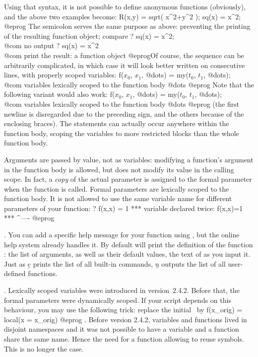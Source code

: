 \noindent Using that syntax, it is not possible to define anonymous functions
(obviously), and the above two examples become:
\bprog
R(x,y) = sqrt( x^2+y^2 );
sq(x) = x^2;
@eprog\noindent
The semicolon serves the same purpose as above: preventing the printing
of the resulting function object; compare
\bprog
? sq(x) = x^2;  \\@com no output
? sq(x) = x^2   \\@com print the result: a function object
@eprog\noindent Of course, the sequence  can be arbitrarily
complicated, in which case it will look better written on consecutive lines,
with properly scoped variables:
\bprogpart
{
f($x_0$, $x_1$, @dots) =
  my($t_0$, $t_1$, @dots); \\@com variables lexically scoped to the function body
  @dots
}
@eprog \noindent Note that the following variant would also work:
\bprogpart
f($x_0$, $x_1$, @dots) =
{
  my($t_0$, $t_1$, @dots); \\@com variables lexically scoped to the function body
  @dots
}
@eprog \noindent
(the first newline is disregarded due to the preceding \kbd{=} sign, and the
others because of the enclosing braces). The  statements can actually
occur anywhere within the function body, scoping the variables to more
restricted blocks than the whole function body.

Arguments are passed by value, not as variables: modifying a function's
argument in the function body is allowed, but does not modify its value in the
calling scope. In fact, a \emph{copy} of the actual parameter is assigned to
the formal parameter when the function is called. Formal parameters are
lexically scoped to the function body. It is not allowed to use the same
variable name for different parameters of your function:
\bprog
? f(x,x) = 1
  ***   variable declared twice: f(x,x)=1
  ***                                ^----
@eprog

.
You can add a specific help message for your function using ,
but the online help system already handles it. By default 
will print the definition of the function : the list of arguments,
as well as their default values, the text of  as you input it.
Just as \b{c} prints the list of all built-in commands, \b{u} outputs the
list of all user-defined functions.

. Lexically scoped
variables were introduced in version~2.4.2. Before that, the formal
parameters were dynamically scoped. If your script depends on this behaviour,
you may use the following trick: replace the initial  \ by
\bprog
f(x_orig) = local(x = x_orig)
@eprog
. Before version
2.4.2, variables and functions lived in disjoint namespaces and it was not
possible to have a variable and a function share the same name. Hence the
need for a  function allowing to reuse symbols. This is no longer
the case.

